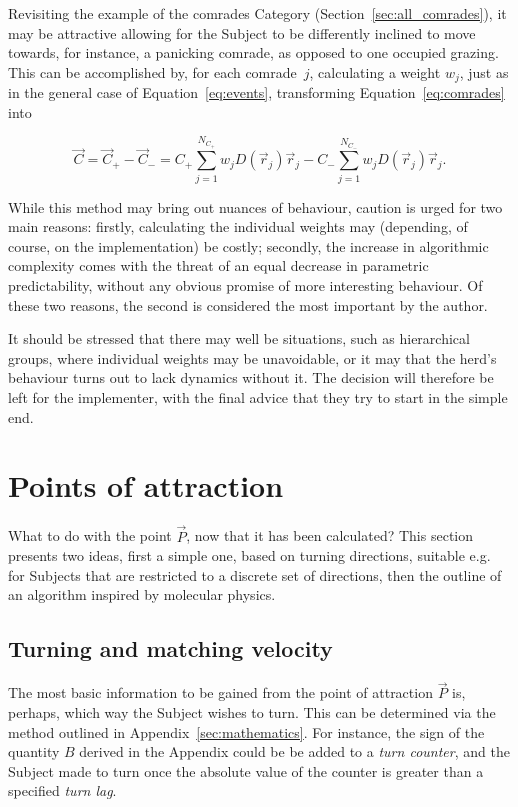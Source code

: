 \documentclass[]{article} %
\begin{document}
Revisiting the example of the comrades Category (Section~\ref{sec:all_comrades}), it may be attractive allowing for the Subject to be differently inclined to move towards, for instance, a panicking comrade, as opposed to one occupied grazing.
This can be accomplished by, for each comrade~$j$, calculating a weight $w_j$,  just as in the general case of Equation~\eqref{eq:events}, transforming Equation~\eqref{eq:comrades} into

\begin{equation}
 \label{eq:comrades_hybrid}
 \vec{C} = \vec{C}_+ - \vec{C}_- = C_+ \sum_{j=1}^{N_{C_+}} w_j D(\vec{r}_j) \vec{r}_j -
                                   C_- \sum_{j=1}^{N_{C_-}} w_j D(\vec{r}_j) \vec{r}_j.
\end{equation}

While this method may bring out nuances of behaviour, caution is urged for two main reasons:
firstly, calculating the individual weights may (depending, of course, on the implementation) be costly; secondly, the increase in algorithmic complexity comes with the threat of an equal decrease in parametric predictability, without any obvious promise of more interesting behaviour.
Of these two reasons, the second is considered the most important by the author. 

It should be stressed that there may well be situations, such as hierarchical groups, where individual weights may be unavoidable, or it may that the herd's behaviour turns out to lack dynamics without it.
The decision will therefore be left for the implementer, with the final advice that they try to start in the simple end.


\section{Points of attraction}
\label{sec:nowwhat}
What to do with the point $\vec{P}$, now that it has been calculated?
This section presents two ideas, first a simple one, based on turning directions, suitable e.g. for Subjects that are restricted to a discrete set of directions, then the outline of an algorithm inspired by molecular physics.


\subsection{Turning and matching velocity}
\label{sec:turning}
The most basic information to be gained from the point of attraction $\vec{P}$ is, perhaps, which way the Subject wishes to turn.
This can be determined via the method outlined in Appendix~\ref{sec:mathematics}.
For instance, the sign of the quantity $B$ derived in the Appendix could be be added to a \emph{turn counter}, and the Subject made to turn once the absolute value of the counter is greater than a specified \emph{turn lag}.
\end{document}
